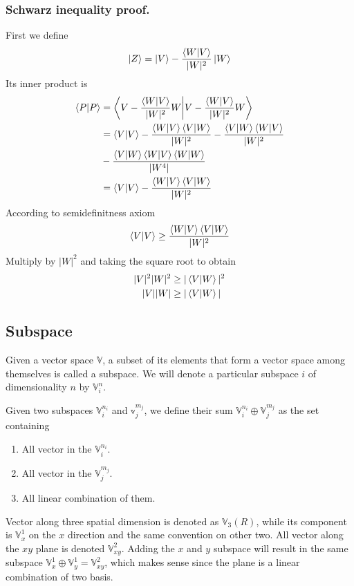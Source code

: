 \documentclass[../main.tex]{subfiles}
\begin{document}
\subsubsection*{Schwarz inequality proof.}
First we define
\begin{equation*}
	\ket{Z}=\ket{V}-\frac{\braket{W|V }}{|W|^2}\ket{W}
\end{equation*}
Its inner product is
\begin{align*}
	\braket{P|P} & =\bigg\langle V-\frac{\braket{W|V }}{|W|^2} W\bigg|V-\frac{\braket{W|V }}{|W|^2}W\bigg\rangle    \\
	             & =\braket{V|V} -\frac{\braket{W|V }\braket{V|W }}{|W|^2}-\frac{\braket{V|W }\braket{W|V }}{|W|^2} \\
	             & -\frac{\braket{V|W }\braket{W|V }\braket{W|W}}{|W^4|}                                            \\
	             & =\braket{V|V}-\frac{\braket{W|V }\braket{V|W }}{|W|^2}
\end{align*}
According to semidefinitness axiom
\begin{equation*}
	\braket{V|V}\geq \frac{\braket{W|V }\braket{ V|W}}{|W|^2}
\end{equation*}
Multiply by $|W|^2$ and taking the square root to obtain
\begin{align*}
	|V|^2|W|^2 & \geq|\braket{V|W}|^2 \\
	|V||W|     & \geq|\braket{V|W}|
\end{align*}

\subsection*{Subspace}
Given a vector space $\mathbb{V}$, a subset of its elements that form a vector space among themselves is called a subspace.
We will denote a particular subspace $i$ of dimensionality $n$ by $\mathbb{V}_i^n$.

Given two subspaces $\mathbb{V}_i^{n_i}$ and $\mathbb{v}_j^{m_j}$, we define their sum $\mathbb{V}_i^{n_i}\oplus\mathbb{V}_j^{m_j}$ as the set containing
\begin{enumerate}
	\item All vector in the $\mathbb{V}_i^{n_i}$.
	\item All vector in the $\mathbb{V}_j^{m_j}$.
	\item All linear combination of them.
\end{enumerate}

Vector along three spatial dimension is denoted as $\mathbb{V}_3(R)$, while its component is $\mathbb{V}_x^1$ on the $x$ direction and the same convention on other two.
All vector along the $xy$ plane is denoted $\mathbb{V}_{xy}^2$.
Adding the $x$ and $y$ subspace will result in the same subspace $\mathbb{V}_x^1\oplus \mathbb{V}_y^1=\mathbb{V}_{xy}^2$, which makes sense since the plane is a linear combination of two basis.
\end{document}
